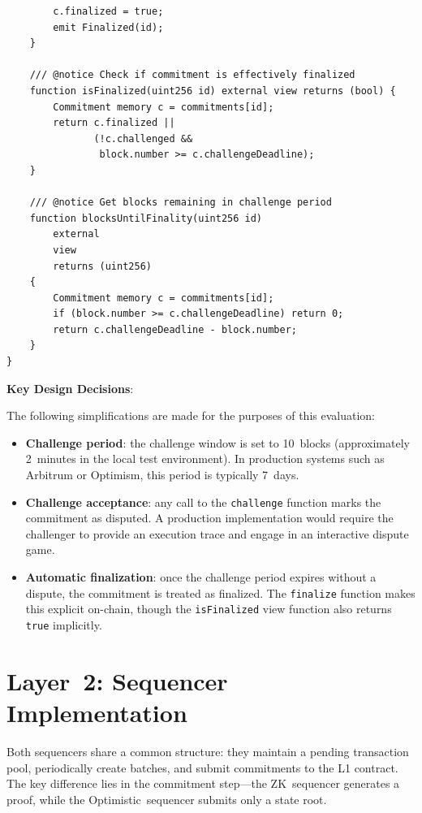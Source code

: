 \documentclass[
]{elteikthesis}[2024/04/26]
\begin{document}
\begin{listing}[H]
\begin{verbatim}
        c.finalized = true;
        emit Finalized(id);
    }

    /// @notice Check if commitment is effectively finalized
    function isFinalized(uint256 id) external view returns (bool) {
        Commitment memory c = commitments[id];
        return c.finalized || 
               (!c.challenged && 
                block.number >= c.challengeDeadline);
    }

    /// @notice Get blocks remaining in challenge period
    function blocksUntilFinality(uint256 id) 
        external 
        view 
        returns (uint256) 
    {
        Commitment memory c = commitments[id];
        if (block.number >= c.challengeDeadline) return 0;
        return c.challengeDeadline - block.number;
    }
}
    \end{verbatim}
    \caption{OptimisticVerifier.sol - Optimistic contract implementation}
    \label{lst:optverifier}
\end{listing}

\textbf{Key Design Decisions}:

The following simplifications are made for the purposes of this evaluation:
\begin{itemize}
    \item \textbf{Challenge period}: the challenge window is set to 10~blocks (approximately 2~minutes in the local test environment). In production systems such as Arbitrum or Optimism, this period is typically 7~days.
    \item \textbf{Challenge acceptance}: any call to the \texttt{challenge} function marks the commitment as disputed. A production implementation would require the challenger to provide an execution trace and engage in an interactive dispute game.
    \item \textbf{Automatic finalization}: once the challenge period expires without a dispute, the commitment is treated as finalized. The \texttt{finalize} function makes this explicit on-chain, though the \texttt{isFinalized} view function also returns \texttt{true} implicitly.
\end{itemize}

\section{Layer~2: Sequencer Implementation}

Both sequencers share a common structure: they maintain a pending transaction pool, periodically create batches, and submit commitments to the L1 contract. The key difference lies in the commitment step---the ZK~sequencer generates a proof, while the Optimistic~sequencer submits only a state root.
\end{document}
